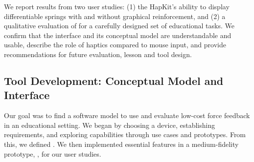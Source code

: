 We report results from two user studies: 
(1) the HapKit's ability to display differentiable springs with and without graphical reinforcement, and 
(2) a qualitative evaluation of \SpringSim for a carefully designed set of  educational tasks.
We confirm that the \SpringSim interface and its conceptual model \HandsOnCM %
are understandable and usable, 
describe the role of haptics compared to mouse input, and
provide %
recommendations
for future evaluation, lesson and tool design.

\subsection{Tool Development: Conceptual Model and Interface}
Our goal was to find a software model to use and evaluate low-cost force feedback in an educational setting.
We began by choosing a device, establishing requirements, and exploring capabilities through use cases and prototypes.
From this, we defined %
\HandsOn.
We then implemented  essential features in a medium-fidelity prototype, \SpringSim, for our user studies.




